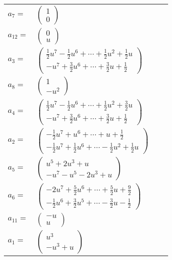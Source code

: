 \documentclass[1p]{elsarticle_modified}
\theoremstyle{definition}
\begin{document}
\begin{tabular}{m{7pt} m{180pt} m{7pt} m{180pt} }
\flushright $a_{7}=$&$\begin{pmatrix}1\\0\end{pmatrix}$ \\
\flushright $a_{12}=$&$\begin{pmatrix}0\\u\end{pmatrix}$ \\
\flushright $a_{3}=$&$\begin{pmatrix}\frac{1}{2} u^7-\frac{1}{2} u^6+\cdots+\frac{1}{2} u^2+\frac{1}{2} u\\- u^7+\frac{3}{2} u^6+\cdots+\frac{3}{2} u+\frac{1}{2}\end{pmatrix}$ \\
\flushright $a_{8}=$&$\begin{pmatrix}1\\- u^2\end{pmatrix}$ \\
\flushright $a_{4}=$&$\begin{pmatrix}\frac{1}{2} u^7-\frac{1}{2} u^6+\cdots+\frac{1}{2} u^2+\frac{3}{2} u\\- u^7+\frac{3}{2} u^6+\cdots+\frac{3}{2} u+\frac{1}{2}\end{pmatrix}$ \\
\flushright $a_{2}=$&$\begin{pmatrix}-\frac{1}{2} u^7+u^6+\cdots+u+\frac{1}{2}\\-\frac{1}{2} u^7+\frac{1}{2} u^6+\cdots-\frac{1}{2} u^2+\frac{1}{2} u\end{pmatrix}$ \\
\flushright $a_{5}=$&$\begin{pmatrix}u^5+2 u^3+u\\- u^7- u^5-2 u^3+u\end{pmatrix}$ \\
\flushright $a_{6}=$&$\begin{pmatrix}-2 u^7+\frac{5}{2} u^6+\cdots+\frac{5}{2} u+\frac{9}{2}\\-\frac{1}{2} u^6+\frac{3}{2} u^5+\cdots-\frac{3}{2} u-\frac{1}{2}\end{pmatrix}$ \\
\flushright $a_{11}=$&$\begin{pmatrix}- u\\u\end{pmatrix}$ \\
\flushright $a_{1}=$&$\begin{pmatrix}u^3\\- u^3+u\end{pmatrix}$ \\

\end{tabular}
\end{document}
